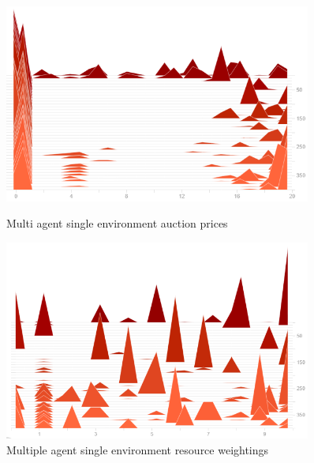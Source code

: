 \begin{figure}
    \centering
    \begin{minipage}{0.45\textwidth}
        \centering
        \includegraphics[width=0.9\textwidth]{figures/env_training_fig/multi_agent_single_env_auction_price.png}
        \caption{Multi agent single environment auction prices}
        \label{fig:multi_agent_single_env_auction_prices}
    \end{minipage}\hfill
    \begin{minipage}{0.45\textwidth}
        \centering
        \includegraphics[width=0.9\textwidth]{figures/env_training_fig/multi_agents_single_env_weightings.png}
        \caption{Multiple agent single environment resource weightings}
        \label{fig:multi_agent_single_env_weightings}
    \end{minipage}
\end{figure}

